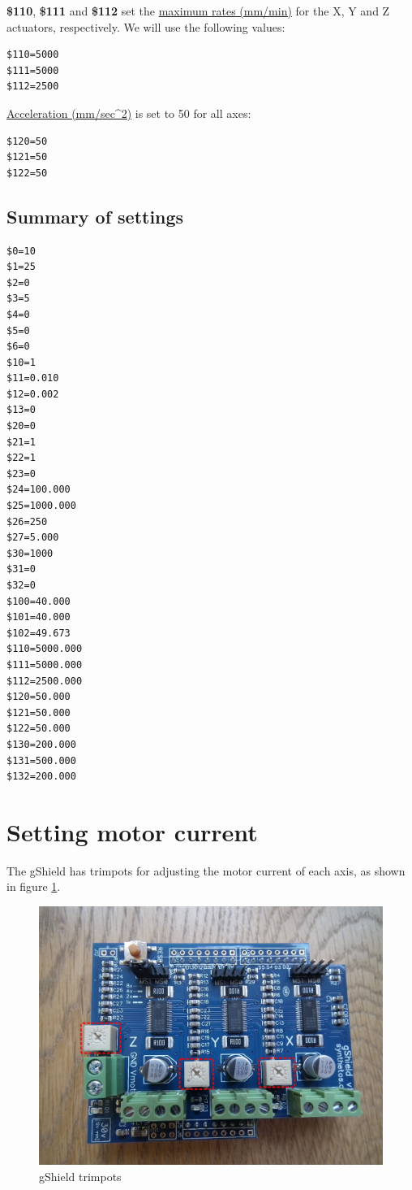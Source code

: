 \documentclass[]{book}
\theoremstyle{definition}
\theoremstyle{definition}
\theoremstyle{remark}
\begin{document}
\textbf{\$110}, \textbf{\$111} and \textbf{\$112} set the
\href{https://github.com/gnea/grbl/wiki/Grbl-v1.1-Configuration\#110-111-and-112--xyz-max-rate-mmmin}{maximum
rates (mm/min)} for the X, Y and Z actuators, respectively. We will use
the following values:

\begin{verbatim}
$110=5000
$111=5000
$112=2500
\end{verbatim}

\href{https://github.com/gnea/grbl/wiki/Grbl-v1.1-Configuration\#120-121-122--xyz-acceleration-mmsec2}{Acceleration
(mm/sec\^{}2)} is set to 50 for all axes:

\begin{verbatim}
$120=50
$121=50
$122=50
\end{verbatim}

\subsection{Summary of settings}\label{summary-of-settings}

\begin{verbatim}
$0=10
$1=25
$2=0
$3=5
$4=0
$5=0
$6=0
$10=1
$11=0.010
$12=0.002
$13=0
$20=0
$21=1
$22=1
$23=0
$24=100.000
$25=1000.000
$26=250
$27=5.000
$30=1000
$31=0
$32=0
$100=40.000
$101=40.000
$102=49.673
$110=5000.000
$111=5000.000
$112=2500.000
$120=50.000
$121=50.000
$122=50.000
$130=200.000
$131=500.000
$132=200.000
\end{verbatim}

\section{Setting motor current}\label{setting-motor-current}

The gShield has trimpots for adjusting the motor current of each axis,
as shown in figure \ref{fig:gShield}.

\begin{figure}

{\centering \includegraphics[width=0.75\linewidth]{images/gShield-trimpots} 

}

\caption{gShield trimpots}\label{fig:gShield}
\end{figure}
\end{document}
